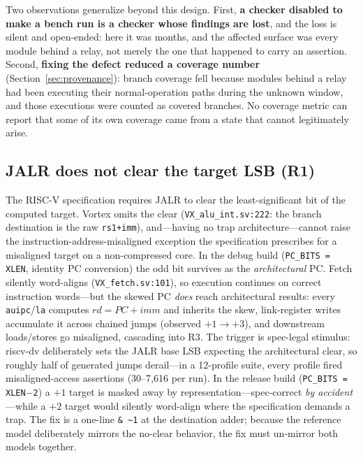 \documentclass[conference]{IEEEtran}
\newcommand{\code}[1]{\texttt{\small #1}}
\begin{document}
Two observations generalize beyond this design. First, \textbf{a checker
disabled to make a bench run is a checker whose findings are lost}, and the
loss is silent and open-ended: here it was months, and the affected surface
was every module behind a relay, not merely the one that happened to carry
an assertion. Second, \textbf{fixing the defect reduced a coverage number}
(Section~\ref{sec:provenance}): branch coverage fell because modules behind
a relay had been executing their normal-operation paths during the unknown
window, and those executions were counted as covered branches. No coverage
metric can report that some of its own coverage came from a state that
cannot legitimately arise.

\subsection{JALR does not clear the target LSB (R1)}
The RISC-V specification requires JALR to clear the least-significant
bit of the computed target. Vortex omits the clear
(\code{VX\_alu\_int.sv:222}: the branch destination is the raw
\code{rs1+imm}), and---having no trap architecture---cannot raise the
instruction-address-misaligned exception the specification prescribes
for a misaligned target on a non-compressed core. In the debug build
(\code{PC\_BITS = XLEN}, identity PC conversion) the odd bit survives
as the \emph{architectural} PC. Fetch silently word-aligns
(\code{VX\_fetch.sv:101}), so execution continues on correct
instruction words---but the skewed PC \emph{does} reach architectural
results: every \code{auipc}/\code{la} computes
$rd = \textit{PC} + \textit{imm}$ and inherits the skew, link-register
writes accumulate it across chained jumps (observed $+1 \to +3$), and
downstream loads/stores go misaligned, cascading into R3. The
trigger is spec-legal stimulus: riscv-dv deliberately sets the JALR
base LSB expecting the architectural clear, so roughly half of
generated jumps derail---in a 12-profile suite, every profile fired
misaligned-access assertions (30--7{,}616 per run). In the release
build (\code{PC\_BITS = XLEN$-$2}) a $+1$ target is masked away by
representation---spec-correct \emph{by accident}---while a $+2$ target
would silently word-align where the specification demands a trap. The
fix is a one-line \code{\&\,\~{}1} at the destination adder; because
the reference model deliberately mirrors the no-clear behavior, the fix
must un-mirror both models together.

\end{document}
